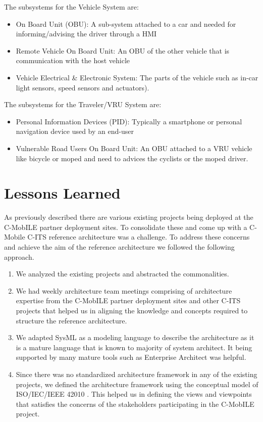 \documentclass[conference]{IEEEtran}
\begin{document}
The subsystems for the Vehicle System are:
\begin{itemize}
	\item On Board Unit (OBU): A sub-system attached to a car and needed for informing/advising the driver through a HMI 
	\item Remote Vehicle On Board Unit: An OBU of the other vehicle that is communication with the host vehicle
	\item Vehicle Electrical \& Electronic System: The parts of the vehicle such as in-car light sensors, speed sensors and actuators).
\end{itemize} 

The subsystems for the Traveler/VRU System are:
\begin{itemize}
	\item  Personal Information Devices (PID): Typically a smartphone or personal navigation device used by an end-user
	\item Vulnerable Road Users On Board Unit: An OBU attached to a VRU vehicle like bicycle or moped and need to advices the cyclists or the moped driver.
\end{itemize} 




\section{Lessons Learned}
 As previously described there are various existing projects being deployed at the C-MobILE partner deployment sites. To consolidate these and come up with a C-Mobile C-ITS reference architecture was a challenge. To address these concerns and achieve the aim of the reference architecture we followed the following approach.
\begin{enumerate}
	\item We analyzed the existing projects and abstracted the commonalities.
	\item We had weekly architecture team meetings comprising of architecture expertise from the C-MobILE partner deployment sites and other C-ITS projects that helped us in aligning the knowledge and concepts required to structure the reference architecture.
	\item We adapted SysML as a modeling language to describe the architecture as it is a mature language that is known to majority of system architect. It being supported by many mature tools such as Enterprise Architect was helpful.
	\item Since there was no standardized architecture framework in any of the existing projects, we defined the architecture framework using the conceptual model of ISO/IEC/IEEE 42010 \cite{iso42010}. This helped us in defining the views and viewpoints that satisfies the concerns of the stakeholders participating in the C-MobILE project.
\end{enumerate}
\end{document}
